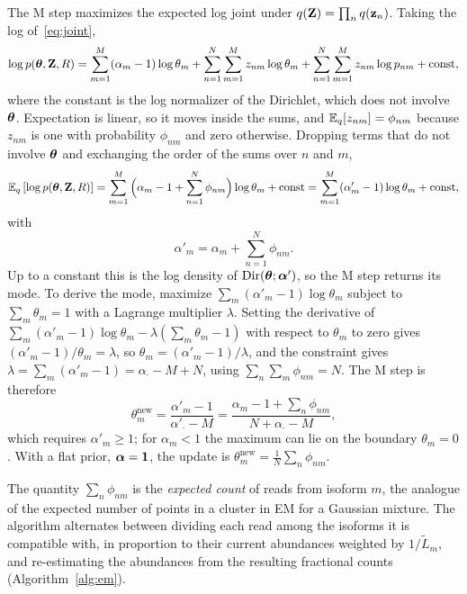 The M step maximizes the expected log joint under $q(\mathbf{Z})=\prod_n q(\mathbf{z}_n)$. Taking the log of~\eqref{eq:joint},
\begin{equation}
  \log p(\boldsymbol{\theta},\mathbf{Z},R) = \sum_{m=1}^M(\alpha_m-1)\log\theta_m + \sum_{n=1}^N\sum_{m=1}^M z_{nm}\log\theta_m + \sum_{n=1}^N\sum_{m=1}^M z_{nm}\log p_{nm} + \text{const},
\end{equation}
where the constant is the log normalizer of the Dirichlet, which does not involve $\boldsymbol{\theta}$. Expectation is linear, so it moves inside the sums, and $\mathbb{E}_q[z_{nm}]=\phi_{nm}$ because $z_{nm}$ is one with probability $\phi_{nm}$ and zero otherwise. Dropping terms that do not involve $\boldsymbol{\theta}$ and exchanging the order of the sums over $n$ and $m$,
\begin{equation}
  \mathbb{E}_q\left[\log p(\boldsymbol{\theta},\mathbf{Z},R)\right] = \sum_{m=1}^M\Big(\alpha_m-1+\sum_{n=1}^N\phi_{nm}\Big)\log\theta_m + \text{const}
  = \sum_{m=1}^M(\alpha'_m-1)\log\theta_m + \text{const},
\end{equation}
with
\begin{equation}
  \alpha'_m = \alpha_m + \sum_{n=1}^N\phi_{nm} .
  \label{eq:alphaprime}
\end{equation}
Up to a constant this is the log density of $\operatorname{Dir}(\boldsymbol{\theta};\boldsymbol{\alpha}')$, so the M step returns its mode. To derive the mode, maximize $\sum_m(\alpha'_m-1)\log\theta_m$ subject to $\sum_m\theta_m=1$ with a Lagrange multiplier $\lambda$. Setting the derivative of $\sum_m(\alpha'_m-1)\log\theta_m-\lambda(\sum_m\theta_m-1)$ with respect to $\theta_m$ to zero gives $(\alpha'_m-1)/\theta_m=\lambda$, so $\theta_m=(\alpha'_m-1)/\lambda$, and the constraint gives $\lambda=\sum_m(\alpha'_m-1)=\alpha_\cdot-M+N$, using $\sum_n\sum_m\phi_{nm}=N$. The M step is therefore
\begin{equation}
  \theta_m^{\text{new}} = \frac{\alpha'_m-1}{\alpha'_\cdot-M} = \frac{\alpha_m-1+\sum_n\phi_{nm}}{N+\alpha_\cdot-M},
  \label{eq:mstep-10}
\end{equation}
which requires $\alpha'_m\geq 1$; for $\alpha_m<1$ the maximum can lie on the boundary $\theta_m=0$. With a flat prior, $\boldsymbol{\alpha}=\mathbf{1}$, the update is $\theta_m^{\text{new}}=\frac{1}{N}\sum_n\phi_{nm}$.

The quantity $\sum_n\phi_{nm}$ is the \emph{expected count} of reads from isoform $m$, the analogue of the expected number of points in a cluster in EM for a Gaussian mixture. The algorithm alternates between dividing each read among the isoforms it is compatible with, in proportion to their current abundances weighted by $1/\tilde L_m$, and re-estimating the abundances from the resulting fractional counts (Algorithm~\ref{alg:em}).

